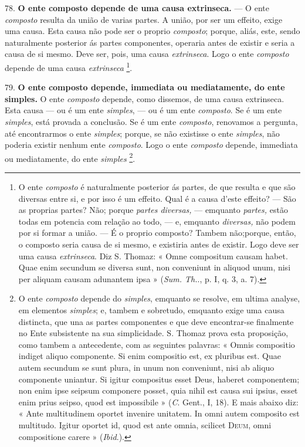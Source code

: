 78. \textbf{O ente composto depende de uma causa extrinseca.} --- O ente \emph{composto} resulta da união de varias partes. A união, por ser um effeito, exige uma causa. Esta causa não pode ser o proprio \emph{composto}; porque, aliás, este, sendo naturalmente posterior ás partes componentes, operaria antes de existir e seria a causa de si mesmo. Deve ser, pois, uma causa \emph{extrinseca}. Logo o ente \emph{composto} depende de uma causa \emph{extrinseca} \footnote{O ente \emph{composto} é naturalmente posterior ás partes, de que resulta e que são diversas entre si, e por isso é um effeito. Qual é a causa d'este effeito? --- São as proprias partes? Não; porque \emph{partes diversas,} --- emquanto \emph{partes,} estão todas em potencia com relação ao todo, --- e, emquanto \emph{diversas,} não podem por si formar a união. --- É o proprio composto? Tambem não;porque, então, o composto seria causa de si mesmo, e existiria antes de existir. Logo deve ser uma causa \emph{extrinseca}. Diz S. Thomaz: « Omne compositum causam habet. Quae enim secundum se diversa sunt, non conveniunt in aliquod unum, nisi per aliquam causam adunantem ipsa » (\emph{Sum. Th.}., p. I, q. 3, a. 7).}.

 79. \textbf{O ente composto depende, immediata ou mediatamente, do ente simples.} O ente \emph{composto} depende, como dissemos, de uma causa extrinseca. Esta causa --- ou é um ente \emph{simples}, --- ou é um ente \emph{composto}. Se é um ente \emph{simples}, está provada a conclusão. Se é um ente \emph{composto}, renovamos a pergunta, até encontrarmos o ente \emph{simples}; porque, se não existisse o ente \emph{simples}, não poderia existir nenhum ente \emph{composto}. Logo o ente \emph{composto} depende, immediata ou mediatamente, do ente \emph{simples} \footnote{O ente \emph{composto} depende do \emph{simples}, emquanto se resolve, em ultima analyse, em elementos \emph{simples}; e, tambem e sobretudo, emquanto exige uma causa distincta, que una as partes componentes e que deve encontrar-se finalmente no Ente subsistente na sua simplicidade. S. Thomaz prova esta proposição, como tambem a antecedente, com as seguintes palavras: « Omnis compositio indiget aliquo componente. Si enim compositio est, ex pluribus est. Quae autem secundum se sunt plura, in unum non conveniunt, nisi ab aliquo componente uniantur. Si igitur compositus esset Deus, haberet componentem; non enim ipse seipsum componere posset, quia nihil est causa sui ipsius, esset enim prius seipso, quod est impossibile » (\emph{C}. Gent., I, 18). E mais abaixo diz: « Ante multitudinem oportet invenire unitatem. In omni autem composito est multitudo. Igitur oportet id, quod est ante omnia, scilicet \textsc{Deum}, omni compositione carere » (\emph{Ibid}.).}.

